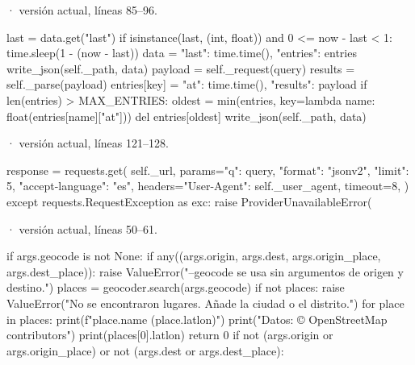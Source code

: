 \documentclass[11pt,a4paper]{article}
\begin{document}
\smallskip
{\footnotesize\texttt{} · versión actual, líneas 85--96.}\par
\begin{Codigo}[firstnumber=85]
                last = data.get("last")
                if isinstance(last, (int, float)) and 0 <= now - last < 1:
                    time.sleep(1 - (now - last))
                data = {"last": time.time(), "entries": entries}
                write_json(self._path, data)
                payload = self._request(query)
                results = self._parse(payload)
                entries[key] = {"at": time.time(), "results": payload}
                if len(entries) > MAX_ENTRIES:
                    oldest = min(entries, key=lambda name: float(entries[name]["at"]))
                    del entries[oldest]
                write_json(self._path, data)
\end{Codigo}

\smallskip
{\footnotesize\texttt{} · versión actual, líneas 121--128.}\par
\begin{Codigo}[firstnumber=121]
            response = requests.get(
                self._url,
                params={"q": query, "format": "jsonv2", "limit": 5, "accept-language": "es"},
                headers={"User-Agent": self._user_agent},
                timeout=8,
            )
        except requests.RequestException as exc:
            raise ProviderUnavailableError(
\end{Codigo}

\smallskip
{\footnotesize\texttt{} · versión actual, líneas 50--61.}\par
\begin{Codigo}[firstnumber=50]
            if args.geocode is not None:
                if any((args.origin, args.dest, args.origin_place, args.dest_place)):
                    raise ValueError("--geocode se usa sin argumentos de origen y destino.")
                places = geocoder.search(args.geocode)
                if not places:
                    raise ValueError("No se encontraron lugares. Añade la ciudad o el distrito.")
                for place in places:
                    print(f"{place.name} ({place.latlon})")
                print("Datos: © OpenStreetMap contributors")
                print(places[0].latlon)
                return 0
            if not (args.origin or args.origin_place) or not (args.dest or args.dest_place):
\end{Codigo}
\end{document}
